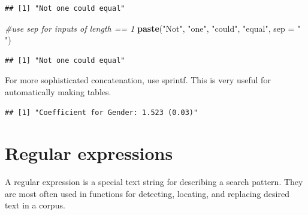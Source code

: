 \documentclass[]{book}
\newenvironment{Shaded}{\begin{snugshade}}{\end{snugshade}}
\newcommand{\CommentTok}[1]{\textcolor[rgb]{0.56,0.35,0.01}{\textit{#1}}}
\newcommand{\DataTypeTok}[1]{\textcolor[rgb]{0.13,0.29,0.53}{#1}}
\newcommand{\FloatTok}[1]{\textcolor[rgb]{0.00,0.00,0.81}{#1}}
\newcommand{\KeywordTok}[1]{\textcolor[rgb]{0.13,0.29,0.53}{\textbf{#1}}}
\newcommand{\NormalTok}[1]{#1}
\newcommand{\StringTok}[1]{\textcolor[rgb]{0.31,0.60,0.02}{#1}}
\theoremstyle{definition}
\theoremstyle{definition}
\theoremstyle{definition}
\theoremstyle{remark}
\begin{document}
\begin{verbatim}
## [1] "Not one could equal"
\end{verbatim}

\begin{Shaded}
\begin{Highlighting}[]
\CommentTok{#use sep for inputs of length == 1 }
\KeywordTok{paste}\NormalTok{(}\StringTok{"Not"}\NormalTok{, }\StringTok{"one"}\NormalTok{, }\StringTok{"could"}\NormalTok{, }\StringTok{"equal"}\NormalTok{, }\DataTypeTok{sep =} \StringTok{" "}\NormalTok{)}
\end{Highlighting}
\end{Shaded}

\begin{verbatim}
## [1] "Not one could equal"
\end{verbatim}

For more sophisticated concatenation, use sprintf. This is very useful for automatically making tables.

\begin{Shaded}
\end{Shaded}

\begin{verbatim}
## [1] "Coefficient for Gender: 1.523 (0.03)"
\end{verbatim}

\begin{Shaded}
\begin{Highlighting}[]
\CommentTok{#%
\CommentTok{#%
\CommentTok{#%
\end{Highlighting}
\end{Shaded}

\hypertarget{regular-expressions}{%
\section{Regular expressions}\label{regular-expressions}}

A regular expression is a special text string for describing a search pattern.
They are most often used in functions for detecting, locating, and replacing desired text in a corpus.
\end{document}
